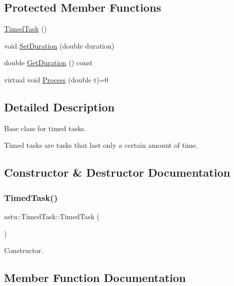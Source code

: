\subsection*{Protected Member Functions}
\begin{DoxyCompactItemize}
\item 
\hyperlink{classastu_1_1TimedTask_ac1ad06e4f881253f519859b2e54731f9}{Timed\+Task} ()
\item 
void \hyperlink{classastu_1_1TimedTask_a69dbe9174c108800f8a882d43c37c53a}{Set\+Duration} (double duration)
\item 
double \hyperlink{classastu_1_1TimedTask_a3eedd7872b46eaf8d2c14bee13435354}{Get\+Duration} () const
\item 
virtual void \hyperlink{classastu_1_1TimedTask_a10e9c957bb0fa2013d2d1ca04a0e0b55}{Process} (double t)=0
\end{DoxyCompactItemize}


\subsection{Detailed Description}
Base class for timed tasks.

Timed tasks are tasks that last only a certain amount of time. 

\subsection{Constructor \& Destructor Documentation}
\mbox{\label{classastu_1_1TimedTask_ac1ad06e4f881253f519859b2e54731f9}} 
\subsubsection{\texorpdfstring{Timed\+Task()}{TimedTask()}}
{\footnotesize\ttfamily astu\+::\+Timed\+Task\+::\+Timed\+Task (\begin{DoxyParamCaption}{ }\end{DoxyParamCaption})\hspace{0.3cm}{\ttfamily [protected]}}

Constructor. 

\subsection{Member Function Documentation}
\mbox{\label{classastu_1_1TimedTask_a3eedd7872b46eaf8d2c14bee13435354}} 
